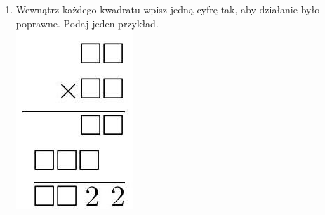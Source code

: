 \documentclass[10pt]{article}
\begin{document}
\begin{enumerate}
  \item Wewnątrz każdego kwadratu wpisz jedną cyfrę tak, aby działanie było poprawne. Podaj jeden przykład.\\
\includegraphics[max width=\textwidth, center]{2024_11_21_a8036543db8f2963a2e7g-1}
\end{enumerate}
\end{document}
